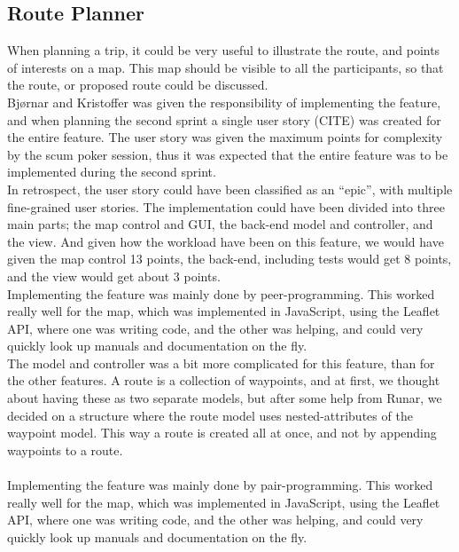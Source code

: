 \documentclass[a4paper]{article}
\begin{document}
\subsection{Route Planner}
When planning a trip, it could be very useful to illustrate the route, and points of interests on a map. This map should be visible to all the participants, so that the route, or proposed route could be discussed.\\

\noindent
Bjørnar and Kristoffer was given the responsibility of implementing the feature, and when planning the second sprint a single user story (CITE) was created for the entire feature. The user story was given the maximum points for complexity by the scum poker session, thus it was expected that the entire feature was to be implemented during the second sprint.\\

\noindent
In retrospect, the user story could have been classified as an “epic”, with multiple fine-grained user stories. The implementation could have been divided into three main parts; the map control and GUI, the back-end model and controller, and the view. And given how the workload have been on this feature, we would have given the map control 13 points, the back-end, including tests would get 8 points, and the view would get about 3 points.\\

\noindent
Implementing the feature was mainly done by peer-programming. This worked really well for the map, which was implemented in JavaScript, using the Leaflet API, where one was writing code, and the other was helping, and could very quickly look up manuals and documentation on the fly.\\

\noindent
The model and controller was a bit more complicated for this feature, than for the other features. A route is a collection of waypoints, and at first, we thought about having these as two separate models,  but after some help from Runar, we decided on a structure where the route model uses nested-attributes of the waypoint model. This way a route is created all at once, and not by appending waypoints to a route. \\

\paragraph{}Implementing the feature was mainly done by pair-programming. This worked really well for the map, which was implemented in JavaScript, using the Leaflet API, where one was writing code, and the other was helping, and could very quickly look up manuals and documentation on the fly.
\end{document}
